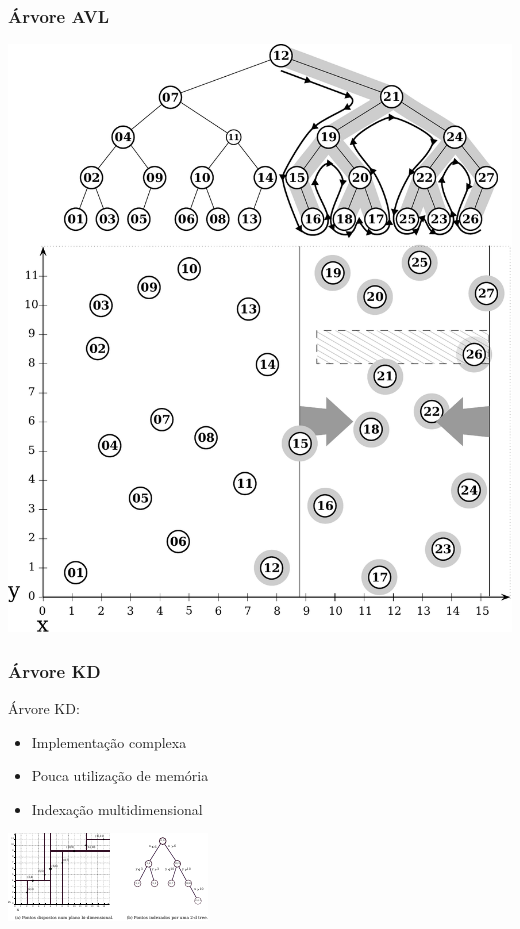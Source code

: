 \documentclass[10pt,xcolor=table,fleqn]{beamer}
\newcommand{\badpt}{{\color{defred} \DOWNarrow }}
\newcommand{\goodpt}{{\color{defgreen} \UParrow }}
\begin{document}
\begin{frame}
  \frametitle{Árvore AVL}
  \begin{center}
    \includegraphics[scale=0.3]{../img/points-query/avl/points-avl-query}
  \end{center}
\end{frame}


\begin{frame}
  \frametitle{Árvore KD}
  Árvore KD:\\
  \vspace{0.6em}
  \begin{itemize}
    \setlength\itemsep{0.6em}
    \item{ Implementação complexa \badpt }
    \item{ Pouca utilização de memória \goodpt }
    \item{ Indexação multidimensional \goodpt }
  \end{itemize}
  \pause
  \begin{center}
    \includegraphics[scale=3.0]{../img/kdt/dom-kd}
  \end{center}
\end{frame}
\end{document}
